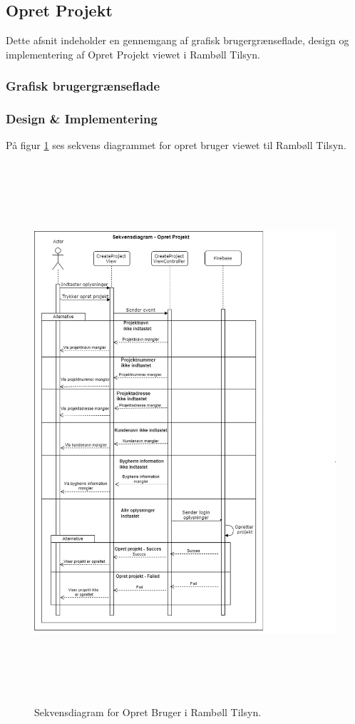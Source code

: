 \subsection{Opret Projekt}
Dette afsnit indeholder en gennemgang af grafisk brugergrænseflade, design og implementering af Opret Projekt viewet i Rambøll Tilsyn.
\subsubsection{Grafisk brugergrænseflade}

\subsubsection{Design \& Implementering}
På figur \ref{fig:OpretProjektSekvens} ses sekvens diagrammet for opret bruger viewet til Rambøll Tilsyn.
\begin{figure}[H] %
	\centering
	\includegraphics[height=20cm, width=15cm]{../ArkitekturDesign/Design/OpretProjekt/OpretProjektSekvensDiagram}
	\caption{Sekvensdiagram for Opret Bruger i Rambøll Tilsyn.}
	\label{fig:OpretProjektSekvens}
\end{figure}